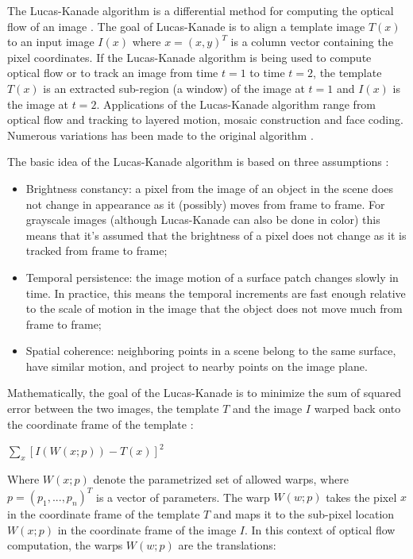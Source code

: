 \documentclass[msc, a4paper, classic, en]{ufbathesis}
\begin{document}
The Lucas-Kanade \cite{lk} algorithm is a differential method for computing the optical flow of an image \cite{kinectkanade}. The goal of Lucas-Kanade is to align a template image $T(x)$ to an input image $I(x)$ where $x = (x, y)^T$ is a column vector containing the pixel coordinates. If the Lucas-Kanade algorithm is being used to compute optical flow or to track an image from time $t = 1$ to time $t = 2$, the template $T(x)$ is an extracted sub-region (a window) of the image at $t = 1$ and $I(x)$ is the image at $t = 2$. Applications of the Lucas-Kanade algorithm range from optical flow and tracking to layered motion, mosaic construction and face coding. Numerous variations has been made to the original algorithm \cite{lk20}.

The basic idea of the Lucas-Kanade algorithm is based on three assumptions \cite{bradski2008learning}:

\begin{itemize}
  \item Brightness constancy: a pixel from the image of an object in the scene does not change in appearance as it (possibly) moves from frame to frame. For grayscale images (although Lucas-Kanade can also be done in color) this means that it's assumed that the brightness of a pixel does not change as it is tracked from frame to frame;
  \item Temporal persistence: the image motion of a surface patch changes slowly in time. In practice, this means the temporal increments are fast enough relative to the scale of motion in the image that the object does not move much from frame to frame;
  \item Spatial coherence: neighboring points in a scene belong to the same surface, have similar motion, and project to nearby points on the image plane.
\end{itemize}

Mathematically, the goal of the Lucas-Kanade is to minimize the sum of squared error between the two images, the template $T$ and the image $I$ warped back onto the coordinate frame of the template \cite{lk20}:

\begin{center}
  $\sum_{x}{[I(W(x;p))-T(x)]^2}$
\end{center}

Where $W(x;p)$ denote the parametrized set of allowed warps, where $p = (p_1,...,p_n)^T$ is a vector of parameters. The warp $W(w;p)$ takes the pixel $x$ in the coordinate frame of the template $T$ and maps it to the sub-pixel location $W(x;p)$ in the coordinate frame of the image $I$. In this context of optical flow computation, the warps $W(w;p)$ are the translations:
\end{document}
